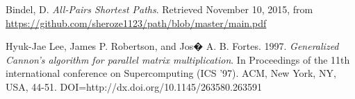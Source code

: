 \documentclass[11pt]{article}
\begin{document}
\begin{thebibliography}{9}
Bindel, D. \textit{All-Pairs Shortest Paths}. Retrieved November 10, 2015, from \url{https://github.com/sheroze1123/path/blob/master/main.pdf}

Hyuk-Jae Lee, James P. Robertson, and Jos� A. B. Fortes. 1997. \textit{Generalized Cannon's algorithm for parallel matrix multiplication}. In Proceedings of the 11th international conference on Supercomputing (ICS '97). ACM, New York, NY, USA, 44-51. DOI=http://dx.doi.org/10.1145/263580.263591

\end{thebibliography}

 
 
\end{document}

